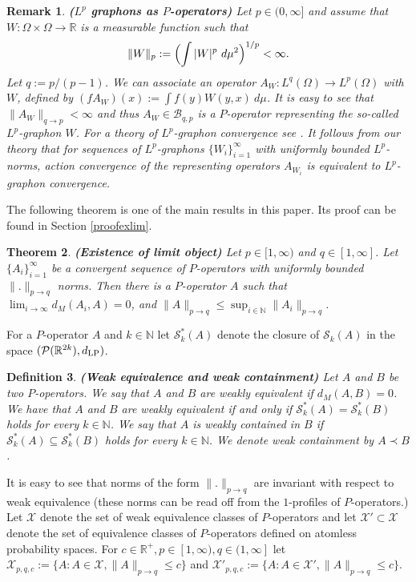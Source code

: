 \documentclass[a4wider]{amsart}
\newtheorem{theorem}{Theorem}[section]
\newtheorem{definition}[theorem]{Definition}
\newtheorem{remarka}[theorem]{Remark}
\theoremstyle{definitionbreak}\newtheorem{D}[theorem]{Definition}
\theoremstyle{definitionbreak}\newtheorem*{D*}{Definition}
\begin{document}
\begin{remarka} {\bf ($L^p$ graphons as $P$-operators)} Let $p\in (0,\infty]$ and assume that $W:\Omega\times\Omega\to\mathbb{R}$ is a measurable function such that $$\|W\|_p:=\Bigl(\int |W|^p~d\mu^2\Bigr)^{1/p}<\infty.$$ Let $q:=p/(p-1)$. We can associate an operator $A_W:L^q(\Omega)\to L^p(\Omega)$ with $W$,  defined by $(fA_{W})(x):=\int f(y)W(y,x)~d\mu$. It is easy to see that $\|A_W\|_{q\to p}<\infty$ and thus $A_W\in\mathcal{B}_{q,p}$ is a $P$-operator representing the so-called $L^p$-graphon $W$. For a theory of $L^p$-graphon convergence see \cite{BCCZ}. It follows from our theory that for sequences of $L^p$-graphons $\{W_i\}_{i=1}^\infty$ with uniformly bounded $L^p$-norms, action convergence of the representing operators $A_{W_i}$ is equivalent to $L^p$-graphon convergence. 
\end{remarka}

The following theorem is one of the main results in this paper. Its proof can be found in Section \ref{proofexlim}. 

\begin{theorem}\label{exlim} {\bf (Existence of limit object)} Let $p\in [1,\infty)$ and $q\in [1,\infty]$. Let $\{A_i\}_{i=1}^\infty$ be a convergent sequence of $P$-operators with uniformly bounded $\|.\|_{p\to q}$ norms. Then there is a $P$-operator $A$ such that $\lim_{i\to\infty} d_M(A_i,A)=0$, and $\|A\|_{p\to q}\leq\sup_{i\in\mathbb{N}}\|A_i\|_{p\to q}$.
\end{theorem}

For a $P$-operator $A$ and $k\in\mathbb{N}$ let $\mathcal{S}_k^*(A)$ denote the closure of $\mathcal{S}_k(A)$ in the space $(\mathcal{P}(\mathbb{R}^{2k}),d_{\rm LP})$.

\begin{definition} {\bf(Weak equivalence and weak containment)} Let $A$ and $B$ be two $P$-operators. We say that $A$ and $B$ are  weakly equivalent if $d_M(A,B)=0$. We have that $A$ and $B$ are weakly equivalent if and only if $\mathcal{S}_k^*(A)=\mathcal{S}_k^*(B)$ holds for every $k\in\mathbb{N}$. We say that $A$ is weakly contained in $B$ if $\mathcal{S}_k^*(A)\subseteq\mathcal{S}_k^*(B)$ holds for every $k\in\mathbb{N}$. We denote weak containment by $A\prec B$.
\end{definition}


It is easy to see that norms of the form $\|.\|_{p\to q}$ are invariant with respect to weak equivalence (these norms can be read off from the $1$-profiles of $P$-operators.) Let $\mathcal{X}$ denote the set of weak equivalence classes of $P$-operators and let $\mathcal{X}'\subset\mathcal{X}$ denote the set of equivalence classes of $P$-operators defined on atomless probability spaces.  For $c\in\mathbb{R}^+, p\in [1,\infty),q\in (1,\infty]$ let  $\mathcal{X}_{p,q,c}:=\{A: A\in\mathcal{X}, \|A\|_{p\to q}\leq c\}$ and $\mathcal{X}'_{p,q,c}:=\{A: A\in\mathcal{X}', \|A\|_{p\to q}\leq c\}$. 
\end{document}
